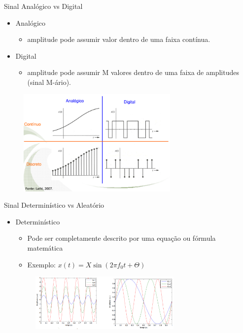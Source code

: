 \documentclass[aspectratio=169,
				xcolor=table]{beamer}
\begin{document}
	\begin{frame}{Sinal Analógico vs Digital}
		\begin{itemize}
			\item Analógico
			\begin{itemize}
				\item amplitude pode assumir valor dentro de uma faixa contínua.
			\end{itemize}
			\vspace{1em}		
			\item Digital
			\begin{itemize}
				\item amplitude pode assumir M valores dentro de uma faixa de
amplitudes (sinal M-ário).
			\end{itemize} 
		\end{itemize}		
	\end{frame}
	
	\begin{frame}{}
				
		\begin{figure}[hbtp]
			\centering
			\includegraphics[width=0.7\textwidth, keepaspectratio]{../figs/cap01/sinais.png}
		\end{figure}
	\end{frame}
	
	\begin{frame}{Sinal Determinístico vs Aleatório}
	
		\begin{itemize}
			\item Determinístico
			\begin{itemize}
				\item Pode ser completamente descrito por uma equação ou fórmula matemática
				\item Exemplo: $x(t)=X\sin(2 \pi f_0 t + \Theta)$
			\end{itemize}				
			\begin{figure}[hbtp]
				\centering
				\includegraphics[width=0.7\textwidth, keepaspectratio]{../figs/cap01/deterministico.png}
			\end{figure}		
		\end{itemize}
		
	\end{frame}
	
\end{document}
